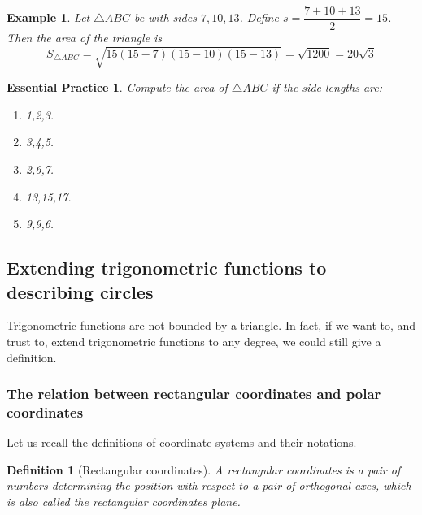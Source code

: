 \documentclass[12pt]{article}
\newtheorem{definition}{Definition}[section]
\newtheorem*{example}{Example}
\newtheorem{exercise}{Essential Practice}[subsection]
\begin{document}
    \begin{example}
        Let $\triangle ABC$ be with sides $7,10,13$. Define $s=\dfrac{7+10+13}{2}=15$. Then the area of the triangle is $$S_{\triangle ABC}=\sqrt{15(15-7)(15-10)(15-13)}=\sqrt{1200}=20\sqrt{3}$$
    \end{example}

    \begin{exercise}
        Compute the area of $\triangle ABC$ if the side lengths are:\begin{enumerate}
            \item 1,2,3.
            \item 3,4,5.
            \item 2,6,7.
            \item 13,15,17.
            \item 9,9,6.
        \end{enumerate}
    \end{exercise}
    \subsection{Extending trigonometric functions to describing circles}

    Trigonometric functions are not bounded by a triangle. In fact, if we want to, and trust to, extend trigonometric functions to any degree, we could still give a definition.

    \subsubsection*{The relation between rectangular coordinates and polar coordinates}

    Let us recall the definitions of coordinate systems and their notations.

    \begin{definition}[Rectangular coordinates]
        A rectangular coordinates is a pair of numbers determining the position with respect to a pair of orthogonal axes, which is also called the rectangular coordinates plane.
    \end{definition}
\end{document}
